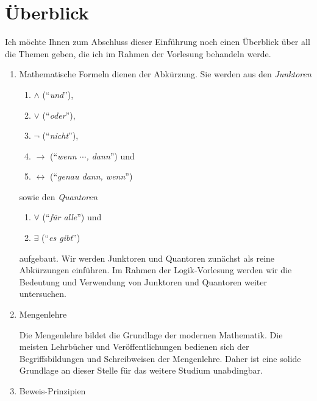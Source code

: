 
\section{Überblick}
Ich möchte Ihnen zum Abschluss dieser Einführung noch einen Überblick über all die Themen geben, die
ich im Rahmen der Vorlesung behandeln werde.  
\begin{enumerate}
\item Mathematische Formeln dienen der Abkürzung.  Sie werden aus den \emph{Junktoren} 
      \begin{enumerate}
      \item $\wedge$ (``\emph{und}''),
      \item $\vee$ (``\emph{oder}''),
      \item $\neg$ (``\emph{nicht}''),
      \item $\rightarrow$ (``\emph{wenn $\cdots$, dann}'') und
      \item $\leftrightarrow$ (``\emph{genau dann, wenn}'') 
      \end{enumerate}
      sowie den \emph{Quantoren}
      \begin{enumerate}
      \item $\forall$ (``\emph{für alle}'') und
      \item $\exists$ (``\emph{es gibt}'') 
      \end{enumerate}
      aufgebaut.
      Wir werden  Junktoren und Quantoren zunächst
      als reine Abkürzungen einführen.  Im Rahmen der Logik-Vorlesung werden wir die Bedeutung
      und Verwendung von Junktoren und Quantoren weiter untersuchen.
\item Mengenlehre

      Die Mengenlehre bildet die Grundlage der modernen Mathematik.  Die meisten Lehrbücher und
      Veröffentlichungen bedienen sich der Begriffsbildungen und Schreibweisen der Mengenlehre.
      Daher ist eine solide Grundlage an dieser Stelle für das weitere Studium unabdingbar.
\item Beweis-Prinzipien


\end{enumerate}
